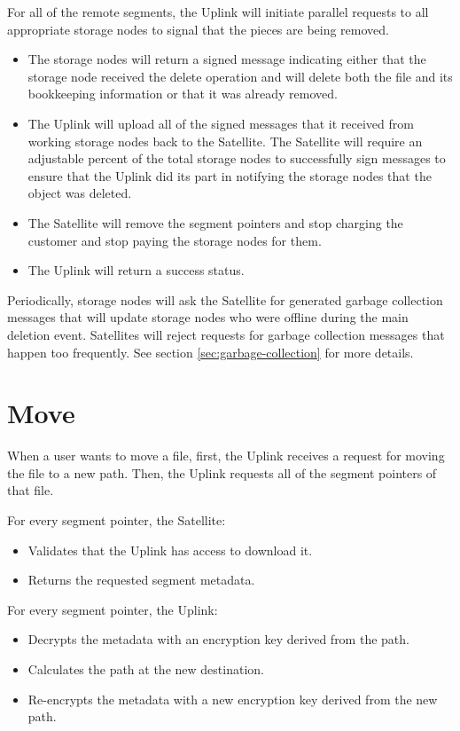 \documentclass[8pt,fleqn,openany]{book}
\begin{document}
For all of the remote segments, the Uplink will
  initiate parallel requests to all appropriate storage nodes to signal that the
  pieces are being removed.

\begin{itemize}
\item The storage nodes will return a signed message indicating either that the storage node
received the
delete operation and will delete both the file and its bookkeeping information
or that it was already removed.
\item The Uplink will upload all of the signed messages that it received from
  working storage nodes back to the Satellite. The Satellite will require an
  adjustable percent of the total storage nodes to successfully sign messages
  to ensure that the Uplink did its part in notifying the storage nodes that the
  object was deleted.
\item The Satellite will remove the segment pointers and stop charging the
  customer and stop paying the storage nodes for them.
\item The Uplink will return a success status.
\end{itemize}

Periodically, storage nodes will ask the Satellite for generated garbage
  collection messages that will update storage nodes who were offline during the
  main deletion event.
  Satellites will reject requests for garbage collection messages that
  happen too frequently. See section \ref{sec:garbage-collection} for more
  details.

\section{Move}

When a user wants to move a file,
first, the Uplink receives a request for moving the file to a new path.
Then, the Uplink requests all of the segment pointers of that file.

For every segment pointer, the Satellite:
  \begin{itemize}
  \item Validates that the Uplink has access to download it.
  \item Returns the requested segment metadata.
  \end{itemize}

For every segment pointer, the Uplink:
  \begin{itemize}
  \item Decrypts the metadata with an encryption key derived from the path.
  \item Calculates the path at the new destination.
  \item Re-encrypts the metadata with a new encryption key derived from the
    new path.
  \end{itemize}
\end{document}
